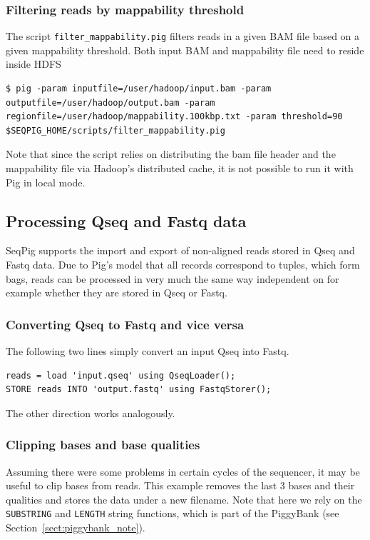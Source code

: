 \subsubsection{Filtering reads by mappability threshold}
The script {\tt filter\_mappability.pig} filters reads in a given BAM file based on a given
mappability threshold. Both input BAM and mappability file need to reside inside HDFS
\begin{lstlisting}
$ pig -param inputfile=/user/hadoop/input.bam -param outputfile=/user/hadoop/output.bam -param regionfile=/user/hadoop/mappability.100kbp.txt -param threshold=90 $SEQPIG_HOME/scripts/filter_mappability.pig
\end{lstlisting}
Note that since the script relies on distributing the bam file header and the
mappability file via Hadoop's distributed cache, it is not possible to run it
with Pig in local mode.

\subsection{Processing Qseq and Fastq data}

SeqPig supports the import and export of non-aligned reads stored in Qseq and
Fastq data. Due to Pig's model that all records correspond to tuples, which
form bags, reads can be processed in very much the same way independent
on for example whether they are stored in Qseq or Fastq.

\subsubsection{Converting Qseq to Fastq and vice versa}

The following two lines simply convert an input Qseq into Fastq.
\begin{lstlisting}
reads = load 'input.qseq' using QseqLoader();
STORE reads INTO 'output.fastq' using FastqStorer(); 
\end{lstlisting}
The other direction works analogously.

\subsubsection{Clipping bases and base qualities}

\label{sect:read_clipping}

Assuming there were some problems in certain cycles of the sequencer, it
may be useful to clip bases from reads. This example removes the last 3
bases and their qualities and stores the data under a new filename. Note
that here we rely on the {\tt SUBSTRING} and {\tt LENGTH} string functions, which is
part of the PiggyBank (see Section~\ref{sect:piggybank_note}).

